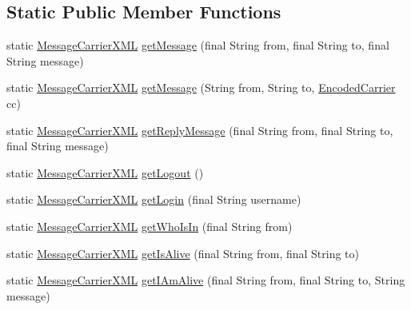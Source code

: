 \subsection*{Static Public Member Functions}
\begin{DoxyCompactItemize}
\item 
static \hyperlink{classgov_1_1fnal_1_1ppd_1_1dd_1_1xml_1_1MessageCarrierXML}{Message\-Carrier\-X\-M\-L} \hyperlink{classgov_1_1fnal_1_1ppd_1_1dd_1_1xml_1_1MessageCarrierXML_a54a7bc9a7197dadd59f10ce66d283995}{get\-Message} (final String from, final String to, final String message)
\item 
static \hyperlink{classgov_1_1fnal_1_1ppd_1_1dd_1_1xml_1_1MessageCarrierXML}{Message\-Carrier\-X\-M\-L} \hyperlink{classgov_1_1fnal_1_1ppd_1_1dd_1_1xml_1_1MessageCarrierXML_a6a30330a8a7c24c3b820b1208e2caccf}{get\-Message} (String from, String to, \hyperlink{classgov_1_1fnal_1_1ppd_1_1dd_1_1xml_1_1EncodedCarrier}{Encoded\-Carrier} cc)
\item 
static \hyperlink{classgov_1_1fnal_1_1ppd_1_1dd_1_1xml_1_1MessageCarrierXML}{Message\-Carrier\-X\-M\-L} \hyperlink{classgov_1_1fnal_1_1ppd_1_1dd_1_1xml_1_1MessageCarrierXML_aa91d3afd3c142177cebf7a38588461c2}{get\-Reply\-Message} (final String from, final String to, final String message)
\item 
static \hyperlink{classgov_1_1fnal_1_1ppd_1_1dd_1_1xml_1_1MessageCarrierXML}{Message\-Carrier\-X\-M\-L} \hyperlink{classgov_1_1fnal_1_1ppd_1_1dd_1_1xml_1_1MessageCarrierXML_a538dab4a8734ec47cf99cf6cf6f6fe98}{get\-Logout} ()
\item 
static \hyperlink{classgov_1_1fnal_1_1ppd_1_1dd_1_1xml_1_1MessageCarrierXML}{Message\-Carrier\-X\-M\-L} \hyperlink{classgov_1_1fnal_1_1ppd_1_1dd_1_1xml_1_1MessageCarrierXML_a1533ef8d2f2df67a473dd508f1835f17}{get\-Login} (final String username)
\item 
static \hyperlink{classgov_1_1fnal_1_1ppd_1_1dd_1_1xml_1_1MessageCarrierXML}{Message\-Carrier\-X\-M\-L} \hyperlink{classgov_1_1fnal_1_1ppd_1_1dd_1_1xml_1_1MessageCarrierXML_a16f86a588277c3fde199a5ba30986e47}{get\-Who\-Is\-In} (final String from)
\item 
static \hyperlink{classgov_1_1fnal_1_1ppd_1_1dd_1_1xml_1_1MessageCarrierXML}{Message\-Carrier\-X\-M\-L} \hyperlink{classgov_1_1fnal_1_1ppd_1_1dd_1_1xml_1_1MessageCarrierXML_aae99eb89f6a79d7f2d12e7b38c07c17d}{get\-Is\-Alive} (final String from, final String to)
\item 
static \hyperlink{classgov_1_1fnal_1_1ppd_1_1dd_1_1xml_1_1MessageCarrierXML}{Message\-Carrier\-X\-M\-L} \hyperlink{classgov_1_1fnal_1_1ppd_1_1dd_1_1xml_1_1MessageCarrierXML_a53b3e07ced810e6899fd655135f88dbd}{get\-I\-Am\-Alive} (final String from, final String to, String message)

\end{DoxyCompactItemize}
